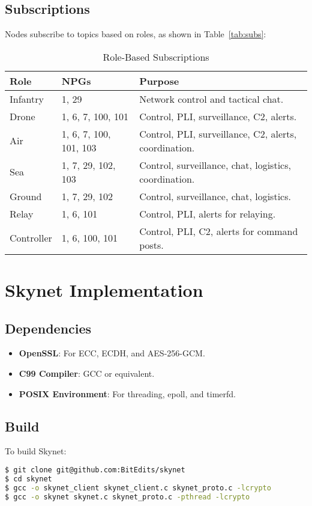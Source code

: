 \documentclass{article}
\begin{document}
\subsection{Subscriptions}
\label{subsec:subs}
Nodes subscribe to topics based on roles, as shown in Table~\ref{tab:subs}:
\begin{table}[h]
\centering
\caption{Role-Based Subscriptions}
\begin{tabular}{llp{8cm}}
\hline
\textbf{Role} & \textbf{NPGs} & \textbf{Purpose} \\
\hline
Infantry & 1, 29 & Network control and tactical chat. \\
Drone & 1, 6, 7, 100, 101 & Control, PLI, surveillance, C2, alerts. \\
Air & 1, 6, 7, 100, 101, 103 & Control, PLI, surveillance, C2, alerts, coordination. \\
Sea & 1, 7, 29, 102, 103 & Control, surveillance, chat, logistics, coordination. \\
Ground & 1, 7, 29, 102 & Control, surveillance, chat, logistics. \\
Relay & 1, 6, 101 & Control, PLI, alerts for relaying. \\
Controller & 1, 6, 100, 101 & Control, PLI, C2, alerts for command posts. \\
\hline
\end{tabular}
\end{table}

\section{Skynet Implementation}

\subsection{Dependencies}
\begin{itemize}
    \item \textbf{OpenSSL}: For ECC, ECDH, and AES-256-GCM.
    \item \textbf{C99 Compiler}: GCC or equivalent.
    \item \textbf{POSIX Environment}: For threading, epoll, and timerfd.
\end{itemize}

\subsection{Build}
To build Skynet:
\begin{lstlisting}[language=bash]
$ git clone git@github.com:BitEdits/skynet
$ cd skynet
$ gcc -o skynet_client skynet_client.c skynet_proto.c -lcrypto
$ gcc -o skynet skynet.c skynet_proto.c -pthread -lcrypto
\end{lstlisting}
\end{document}
